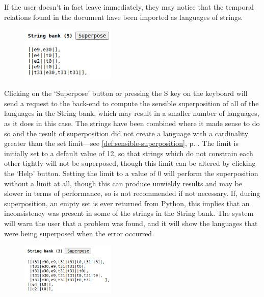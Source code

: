 \documentclass[a4paper,12pt,leqno,twoside]{article}
\begin{document}
If the user doesn't in fact leave immediately, they may notice that the temporal relations found in the document have been imported as languages of strings.
\begin{center}
	\begin{figure}[h!]
		\centering
		\includegraphics[width=0.4\textwidth]{images/START-sp-1.png}
	\end{figure}
\end{center}
Clicking on the `Superpose' button or pressing the S key on the keyboard will send a request to the back-end to compute the sensible superposition of all of the languages in the String bank, which may result in a smaller number of languages, as it does in this case. The strings have been combined where it made sense to do so and the result of superposition did not create a language with a cardinality greater than the set limit---see \cref{def:sensible-superposition}, p. \pageref{def:sensible-superposition}. The limit is initially set to a default value of 12, so that strings which do not constrain each other tightly will not be superposed, though this limit can be altered by clicking the `Help' button. Setting the limit to a value of 0 will perform the superposition without a limit at all, though this can produce unwieldy results and may be slower in terms of performance, so is not recommended if not necessary. If, during superposition, an empty set is ever returned from Python, this implies that an inconsistency was present in some of the strings in the String bank. The system will warn the user that a problem was found, and it will show the languages that were being superposed when the error occurred.
\begin{center}
	\begin{figure}[h!]
		\centering
		\includegraphics[width=0.4\textwidth]{images/START-sp-2.png}
	\end{figure}
\end{center}
\end{document}

